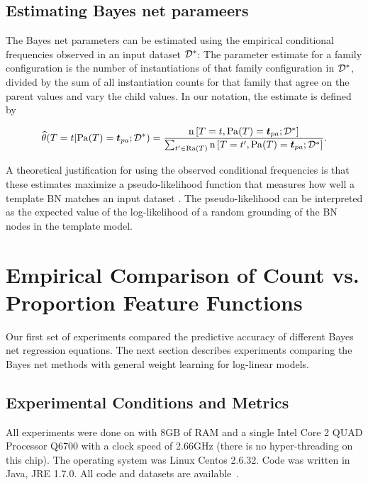 \documentclass[runningheads,a4paper]{llncs}
\begin{document}
\subsection{Estimating Bayes net parameers}

The Bayes net parameters can be estimated using the empirical conditional frequencies observed in an input dataset $\mathcal{D}^{*}\hspace{0.0ex}$: The parameter estimate for a family configuration is the number of instantiations of that family configuration in $\mathcal{D}^{*}\hspace{0.0ex}$, divided by the sum of all instantiation counts for that family that agree on the parent values and vary the child values. In our notation, the estimate is defined by

\newcommand{\CTPa}{\Count{\Appendterm{\TT = \TV} {\Pa{\TT} = \Prange{\TT}}}  {\FG{\D}}}
\newcommand{\CTPb}{\Count{\Appendterm{\TT = \TV'} {\Pa{\TT} = \Prange{\TT}}}  {\FG{\D}}}

\begin{equation} \label{eq:frequencies}
\estcprob{\TT = \TV} {\Pa{\TT} = \Prange{\TT}} {\FG{\D}} = 
    \frac{\CTPa}
           {\sum_{\TV' \in \Range{\TT}}\CTPb}.
\end{equation}

A theoretical justification for using the observed conditional frequencies is that these estimates maximize a pseudo-likelihood function that measures how well a template BN matches an input dataset \cite{Schulte2011,Schulte2013}. The pseudo-likelihood can be interpreted as the expected value of the log-likelihood of a random grounding of the BN nodes in the template model.

\section{Empirical Comparison of Count vs. Proportion Feature Functions}\label{sec:empirical-comparison}

Our first set of experiments compared the predictive accuracy of different Bayes net regression equations. The next section describes experiments comparing the Bayes net methods with general weight learning for log-linear models. 

\subsection{Experimental Conditions and Metrics}\label{sec:conditions}

All experiments were done on with 8GB of RAM and a single Intel Core 2 QUAD Processor Q6700 with a clock speed of 2.66GHz (there is no hyper-threading on this chip). The operating system was Linux Centos 2.6.32. Code was written in Java, JRE 1.7.0. All code and datasets are available~\cite{bib:jbnsite}. 
\end{document}
